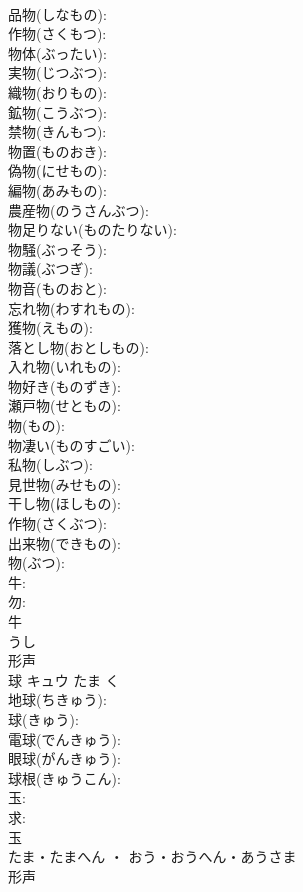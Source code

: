 \documentclass[8pt]{extreport}
\begin{document}
\begin{CJK}{UTF8}{min}
\\	品物(しなもの): 
\\	作物(さくもつ): 
\\	物体(ぶったい): 
\\	実物(じつぶつ): 
\\	織物(おりもの): 
\\	鉱物(こうぶつ): 
\\	禁物(きんもつ): 
\\	物置(ものおき): 
\\	偽物(にせもの): 
\\	編物(あみもの): 
\\	農産物(のうさんぶつ): 
\\	物足りない(ものたりない): 
\\	物騒(ぶっそう): 
\\	物議(ぶつぎ): 
\\	物音(ものおと): 
\\	忘れ物(わすれもの): 
\\	獲物(えもの): 
\\	落とし物(おとしもの): 
\\	入れ物(いれもの): 
\\	物好き(ものずき): 
\\	瀬戸物(せともの): 
\\	物(もの): 
\\	物凄い(ものすごい): 
\\	私物(しぶつ): 
\\	見世物(みせもの): 
\\	干し物(ほしもの): 
\\	作物(さくぶつ): 
\\	出来物(できもの): 
\\	物(ぶつ): 
\\	牛: 
\\	勿: 
\\	牛	
\\	うし	
\\	形声 
\\	球	キュウ	たま	く	
\\	地球(ちきゅう): 
\\	球(きゅう): 
\\	電球(でんきゅう): 
\\	眼球(がんきゅう): 
\\	球根(きゅうこん): 
\\	玉: 
\\	求: 
\\	玉	
\\	たま・たまへん ・ おう・おうへん・あうさま	
\\	形声 

\end{CJK}
\end{document}
